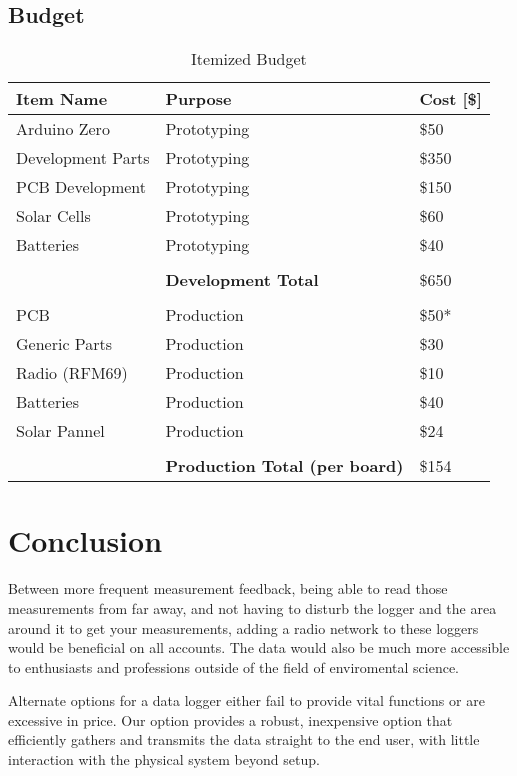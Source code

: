 \documentclass[12pt]{article}
\begin{document}
\subsection{Budget}
\begin{table}[H]
\centering
\caption{Itemized Budget}
\label{my-label}
\begin{tabular}{lll}
\textbf{Item Name}         & \textbf{Purpose}                      & \textbf{Cost {[}\${]}} \\
\hline
Arduino Zero      & Prototyping                  & \$50          \\
Development Parts & Prototyping                  & \$350         \\
PCB Development   & Prototyping                  & \$150         \\
Solar Cells       & Prototyping                  & \$60          \\
Batteries         & Prototyping                  & \$40          \\
\hline
                  &                              &               \\
                   & \textbf{Development Total}            & \$650         \\
                   &								 &\\
PCB               & Production                   & \$50*         \\
Generic Parts     & Production                   & \$30          \\
Radio (RFM69)     & Production                   & \$10          \\
Batteries         & Production                   & \$40          \\
Solar Pannel      & Production                   & \$24          \\
\hline
                  &                              &               \\

                  & \textbf{Production Total (per board)} & \$154
\end{tabular}
\end{table}


\section{Conclusion}
Between more frequent measurement feedback, being able to read those measurements from far away, and not having to disturb the logger and the area around it to get your measurements, adding a radio network to these loggers would be beneficial on all accounts.  The data would also be much more accessible to enthusiasts and professions outside of the field of enviromental science.

Alternate options for a data logger either fail to provide vital functions or are excessive in price.  Our option provides a robust, inexpensive option that efficiently gathers and transmits the data straight to the end user, with little interaction with the physical system beyond setup.  
\end{document}
